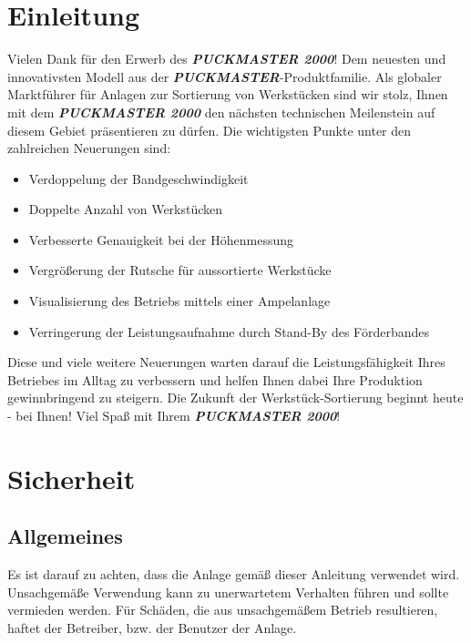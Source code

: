 \documentclass[oneside,a4paper,titlepage]{scrartcl} %
\begin{document}
\newpage

\section{Einleitung}
Vielen Dank für den Erwerb des \textbf{\emph{PUCKMASTER 2000}}!\newline\newline
Dem neuesten und innovativsten Modell aus der \textbf{\emph{PUCKMASTER}}-Produktfamilie.\newline\newline
Als globaler Marktführer für Anlagen zur Sortierung von Werkstücken sind wir stolz, Ihnen mit dem \textbf{\emph{PUCKMASTER 2000}} den nächsten technischen Meilenstein auf diesem Gebiet präsentieren zu dürfen.\newline\newline
Die wichtigsten Punkte unter den zahlreichen Neuerungen sind:\newline
\begin{itemize}
  \item Verdoppelung der Bandgeschwindigkeit
  \item Doppelte Anzahl von Werkstücken
  \item Verbesserte Genauigkeit bei der Höhenmessung
  \item Vergrößerung der Rutsche für aussortierte Werkstücke
  \item Visualisierung des Betriebs mittels einer Ampelanlage
  \item Verringerung der Leistungsaufnahme durch Stand-By des Förderbandes\newline
\end{itemize}
Diese und viele weitere Neuerungen warten darauf die Leistungsfähigkeit Ihres Betriebes im Alltag zu verbessern und helfen Ihnen dabei Ihre Produktion gewinnbringend zu steigern.\newline\newline
Die Zukunft der Werkstück-Sortierung beginnt heute - bei Ihnen!\newline\newline
Viel Spaß mit Ihrem \textbf{\emph{PUCKMASTER 2000}}!

\newpage 

\section{Sicherheit}
\subsection{Allgemeines}
Es ist darauf zu achten, dass die Anlage gemäß dieser Anleitung verwendet wird. Unsachgemäße Verwendung
kann zu unerwartetem Verhalten führen und sollte vermieden werden. Für Schäden, die aus unsachgemäßem Betrieb resultieren, haftet der Betreiber, bzw. der Benutzer der Anlage.
\end{document}
